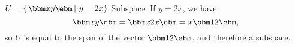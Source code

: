 {$U = \left\{\left. \bbm x\\y \ebm \, \right| \, y=2x\right\}$}
{Subspace. If $y=2x$, we have 
\[
\bbm x\\y\ebm = \bbm x\\2x\ebm = x\bbm 1\\2\ebm,
\]
so $U$ is equal to the span of the vector $\bbm 1\\2\ebm$, and therefore a subspace.}